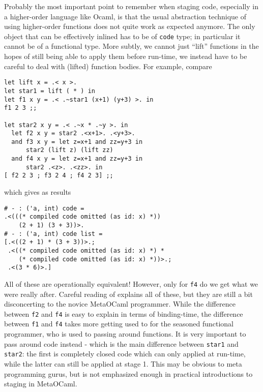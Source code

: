 \documentclass[11pt]{elsart}
\begin{document}
Probably the most important point to remember when staging code, especially
in a higher-order language like Ocaml, is that the usual abstraction
technique of using higher-order functions does not quite work as 
expected anymore.  The only object that can be effectively inlined
has to be of \texttt{code} type; in particular it cannot be of
a functional type.  More subtly, we cannot just ``lift'' functions in the
hopes of still being able to apply them before run-time, we instead have to
be careful to deal with (lifted) function bodies.  For example, compare
\begin{small}
\begin{verbatim}
let lift x = .< x >.
let star1 = lift ( * ) in
let f1 x y = .< .~star1 (x+1) (y+3) >. in
f1 2 3 ;;

let star2 x y = .< .~x * .~y >. in
  let f2 x y = star2 .<x+1>. .<y+3>. 
  and f3 x y = let z=x+1 and zz=y+3 in 
      star2 (lift z) (lift zz) 
  and f4 x y = let z=x+1 and zz=y+3 in 
      star2 .<z>. .<zz>. in
[ f2 2 3 ; f3 2 4 ; f4 2 3] ;;
\end{verbatim}
\end{small}
\noindent which gives as results
\begin{small}
\begin{verbatim}
# - : ('a, int) code =
.<(((* compiled code omitted (as id: x) *)) 
    (2 + 1) (3 + 3))>.
# - : ('a, int) code list =
[.<((2 + 1) * (3 + 3))>.;
 .<((* compiled code omitted (as id: x) *) *
    (* compiled code omitted (as id: x) *))>.;
 .<(3 * 6)>.]
\end{verbatim}
\end{small}

All of these are operationally equivalent!  However, only for
\texttt{f4} do we get what we were really after.
Careful reading of \cite{TahaThesis} explains all of these, but
they are still a bit disconcerting to the novice MetaOCaml programmer.
While the difference between \texttt{f2} and \texttt{f4} is easy to
explain in terms of binding-time, the difference between \texttt{f1}
and \texttt{f4} takes more getting used to for the seasoned functional
programmer, who is used to passing around functions.  It is very 
important to pass around code instead - which is the main difference
between \texttt{star1} and \texttt{star2}: the first is completely
closed code which can only applied at run-time, while the latter can
still be applied at stage 1.  This may be obvious to meta programming
gurus, but is not emphasized enough in practical introductions to
staging in MetaOCaml.
\end{document}

